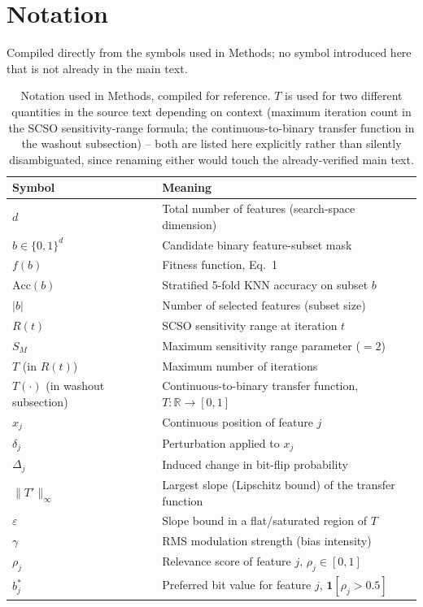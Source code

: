 \documentclass[9pt]{article}
\begin{document}
\FloatBarrier
\section{Notation}
Compiled directly from the
symbols used in Methods; no symbol introduced here that is not already in
the main text.

\begin{table}[t]
\centering
\caption{Notation used in Methods, compiled for reference. $T$ is used for two different quantities in the source text depending on context (maximum iteration count in the SCSO sensitivity-range formula; the continuous-to-binary transfer function in the washout subsection) -- both are listed here explicitly rather than silently disambiguated, since renaming either would touch the already-verified main text.}
\label{tab:notation}
\footnotesize
\begin{tabular}{lp{9cm}}
\toprule
Symbol & Meaning \\
\midrule
$d$ & Total number of features (search-space dimension) \\
$b\in\{0,1\}^d$ & Candidate binary feature-subset mask \\
$f(b)$ & Fitness function, Eq.~1 \\
$\mathrm{Acc}(b)$ & Stratified 5-fold KNN accuracy on subset $b$ \\
$|b|$ & Number of selected features (subset size) \\
$R(t)$ & SCSO sensitivity range at iteration $t$ \\
$S_M$ & Maximum sensitivity range parameter ($=2$) \\
$T$ (in $R(t)$) & Maximum number of iterations \\
$T(\cdot)$ (in washout subsection) & Continuous-to-binary transfer function, $T:\mathbb{R}\to[0,1]$ \\
$x_j$ & Continuous position of feature $j$ \\
$\delta_j$ & Perturbation applied to $x_j$ \\
$\Delta_j$ & Induced change in bit-flip probability \\
$\|T'\|_\infty$ & Largest slope (Lipschitz bound) of the transfer function \\
$\varepsilon$ & Slope bound in a flat/saturated region of $T$ \\
$\gamma$ & RMS modulation strength (bias intensity) \\
$\rho_j$ & Relevance score of feature $j$, $\rho_j\in[0,1]$ \\
$b^\ast_j$ & Preferred bit value for feature $j$, $\mathbf{1}[\rho_j>0.5]$ \\

\end{tabular}
\end{table}
\end{document}
